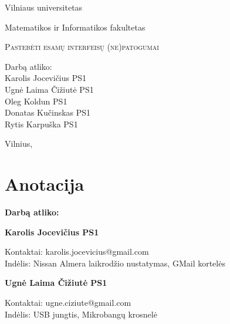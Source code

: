 ﻿\documentclass[a4paper, 12pt]{article}
\newcommand{\OK}{Oleg Koldun PS1}
\newcommand{\UC}{Ugnė Laima Čižiutė PS1}
\newcommand{\RK}{Rytis Karpuška PS1}
\newcommand{\DK}{Donatas Kučinskas PS1}
\newcommand{\KJ}{Karolis Jocevičius PS1}
\begin{document}


	\begin{titlepage}

		\begin{center}
	
			\large {Vilniaus universitetas
	
					Matematikos ir Informatikos fakultetas}
			
			\vspace*{\fill}
	
		\textsc{\Huge Pastebėti esamų interfeisų (ne)patogumai} \\[0.5cm]
	
		\vspace{3cm}
	
			\begin{flushright}
				\begin{minipage}{0.35\textwidth}
				{\large Darbą atliko:} \\
					\KJ \\
					\UC \\
					\OK \\
					\DK \\
					\RK
				\end{minipage}
			\end{flushright}
	
			\vspace{\fill}
	
			{\Large Vilnius, \the\year}
			
		\end{center}
	\end{titlepage}
	

\section*{Anotacija}
	
		\textbf{Darbą atliko:}
		
		
		\textbf{\KJ}
		\begin{flushleft}
		\hspace*{1.5cm}
		Kontaktai:
			karolis.jocevicius@gmail.com
		\\
		\hspace*{1.5cm}
		Indėlis: Nissan Almera laikrodžio nustatymas, GMail kortelės 
		\end{flushleft}
		
		\textbf{\UC}
		\begin{flushleft}
		\hspace*{1.5cm}
		Kontaktai: 
			ugne.ciziute@gmail.com
		\\
		\hspace*{1.5cm}
		Indėlis: USB jungtis, Mikrobangų krosnelė
		\end{flushleft}
		
\end{document}
